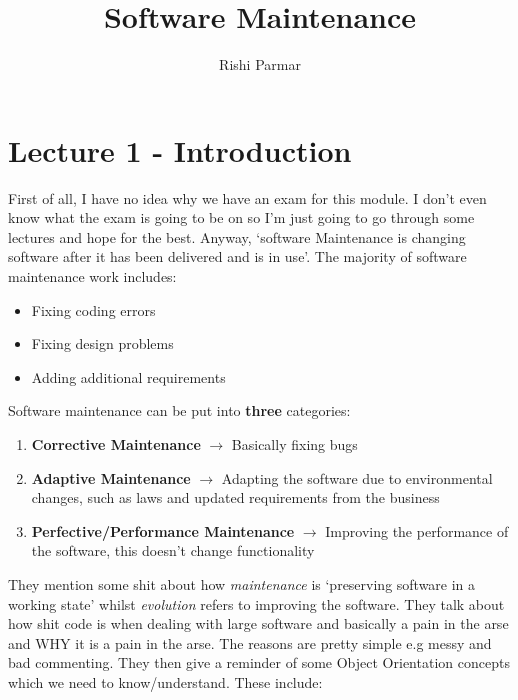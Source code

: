 \documentclass{article}
\begin{document}
\title{Software Maintenance}
\author{Rishi Parmar}
\maketitle
\newpage
{}
\hypertarget{MyToc}{}
\tableofcontents
\newpage

\section{Lecture 1 - Introduction}
First of all, I have no idea why we have an exam for this module. I don't even know what the exam is going to be on so I'm just going to go through some lectures and hope for the best. Anyway, `software Maintenance is changing software after it has been delivered and is in use'. The majority of software maintenance work includes: 

\begin{itemize}
    \item Fixing coding errors
    \item Fixing design problems
    \item Adding additional requirements
\end{itemize}

Software maintenance can be put into \textbf{three} categories:

\begin{enumerate}
    \item \textbf{Corrective Maintenance} $\longrightarrow$ Basically fixing bugs
    \item \textbf{Adaptive Maintenance} $\longrightarrow$ Adapting the software due to environmental changes, such as laws and updated requirements from the business
    \item \textbf{Perfective/Performance Maintenance} $\longrightarrow$ Improving the performance of the software, this doesn't change functionality
\end{enumerate}

They mention some shit about how \emph{maintenance} is `preserving software in a working state' whilst \emph{evolution} refers to improving the software. They talk about how shit code is when dealing with large software and basically a pain in the arse and WHY it is a pain in the arse. The reasons are pretty simple e.g messy and bad commenting. They then give a reminder of some Object Orientation concepts which we need to know/understand. These include:
\end{document}
